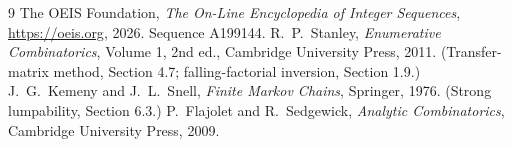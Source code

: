 \documentclass[11pt,a4paper]{article}
\theoremstyle{plain}
\theoremstyle{definition}
\begin{document}
\begin{thebibliography}{9}
 The OEIS Foundation, \emph{The On-Line Encyclopedia of Integer
Sequences}, \url{https://oeis.org}, 2026. Sequence A199144.
 R.~P.~Stanley, \emph{Enumerative Combinatorics}, Volume 1, 2nd ed.,
Cambridge University Press, 2011. (Transfer-matrix method, Section 4.7; falling-factorial
inversion, Section 1.9.)
 J.~G.~Kemeny and J.~L.~Snell, \emph{Finite Markov Chains}, Springer,
1976. (Strong lumpability, Section 6.3.)
 P.~Flajolet and R.~Sedgewick, \emph{Analytic Combinatorics}, Cambridge
University Press, 2009.
\end{thebibliography}
\end{document}
